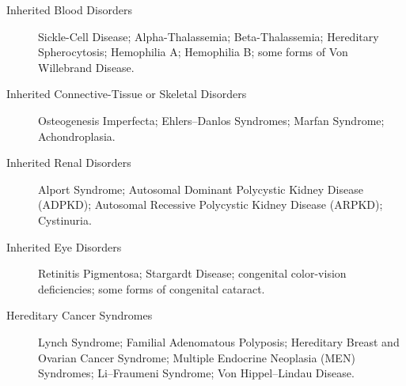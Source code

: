 \begin{description}
\item[Inherited Blood Disorders] Sickle-Cell Disease; Alpha-Thalassemia; Beta-Thalassemia; Hereditary Spherocytosis; Hemophilia A; Hemophilia B; some forms of Von Willebrand Disease.

\item[Inherited Connective-Tissue or Skeletal Disorders] Osteogenesis Imperfecta; Ehlers--Danlos Syndromes; Marfan Syndrome; Achondroplasia.

\item[Inherited Renal Disorders] Alport Syndrome; Autosomal Dominant Polycystic Kidney Disease (ADPKD); Autosomal Recessive Polycystic Kidney Disease (ARPKD); Cystinuria.

\item[Inherited Eye Disorders] Retinitis Pigmentosa; Stargardt Disease; congenital color-vision deficiencies; some forms of congenital cataract.

\item[Hereditary Cancer Syndromes] Lynch Syndrome; Familial Adenomatous Polyposis; Hereditary Breast and Ovarian Cancer Syndrome; Multiple Endocrine Neoplasia (MEN) Syndromes; Li--Fraumeni Syndrome; Von Hippel--Lindau Disease.
\end{description}

